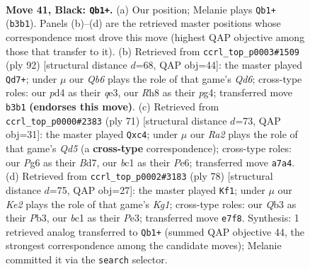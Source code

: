 \documentclass[11pt]{article}
\begin{document}
\clearpage

\begin{figure}[p]\centering
\begin{subfigure}{0.46\textwidth}\centering
\resizebox{\linewidth}{!}{%
\newchessgame
\chessboard[
  setfen={7r/r3k3/1pp3p1/4p1p1/Pp1PK3/1q2P3/R5Q1/2B5 b - - 3 41},
  showmover=false,
  pgfstyle=straightmove, color=movearrow, markmove={b3-b1}
]}
\caption{}
\end{subfigure}\hfill
\begin{subfigure}{0.46\textwidth}\centering
\resizebox{\linewidth}{!}{%
\newchessgame
\chessboard[
  setfen={8/p4k2/1p1Q3p/1PP1rp2/1P4pP/3Pq3/7P/5R1K w - - 27 47},
  showmover=false,
  pgfstyle=straightmove, color=movearrow, markmove={d6-d7}
]}
\caption{}
\end{subfigure}
\\[4pt]
\begin{subfigure}{0.46\textwidth}\centering
\resizebox{\linewidth}{!}{%
\newchessgame
\chessboard[
  setfen={r4k2/1p1b4/4p2p/1P1p4/2Bq1P1Q/6Pp/5N1K/5R2 b - - 0 36},
  showmover=false,
  pgfstyle=straightmove, color=movearrow, markmove={d4-c4}
]}
\caption{}
\end{subfigure}\hfill
\begin{subfigure}{0.46\textwidth}\centering
\resizebox{\linewidth}{!}{%
\newchessgame
\chessboard[
  setfen={2r5/5p1k/6p1/Q2p2P1/P1p3qP/1P2P3/5P2/2R3K1 w - - 1 40},
  showmover=false,
  pgfstyle=straightmove, color=movearrow, markmove={g1-f1}
]}
\caption{}
\end{subfigure}
\caption{\textbf{Move 41, Black: \texttt{Qb1+}.} (a) Our position; Melanie plays \texttt{Qb1+} (\texttt{b3b1}). Panels (b)--(d) are the retrieved master positions whose correspondence most drove this move (highest QAP objective among those that transfer to it). (b) Retrieved from \texttt{ccrl\_top\_p0003\#1509} (ply 92) [structural distance $d$=68, QAP obj=44]: the master played \texttt{Qd7+}; under $\mu$ our \emph{Qb6} plays the role of that game's \emph{Qd6}; cross-type roles: our \emph{p}d4 as their \emph{q}e3, our \emph{R}h8 as their \emph{p}g4; transferred move \texttt{b3b1} \textbf{(endorses this move)}. (c) Retrieved from \texttt{ccrl\_top\_p0000\#2383} (ply 71) [structural distance $d$=73, QAP obj=31]: the master played \texttt{Qxc4}; under $\mu$ our \emph{Ra2} plays the role of that game's \emph{Qd5} (a \textbf{cross-type} correspondence); cross-type roles: our \emph{P}g6 as their \emph{B}d7, our \emph{b}c1 as their \emph{P}e6; transferred move \texttt{a7a4}. (d) Retrieved from \texttt{ccrl\_top\_p0002\#3183} (ply 78) [structural distance $d$=75, QAP obj=27]: the master played \texttt{Kf1}; under $\mu$ our \emph{Ke2} plays the role of that game's \emph{Kg1}; cross-type roles: our \emph{Q}b3 as their \emph{P}b3, our \emph{b}c1 as their \emph{P}e3; transferred move \texttt{e7f8}. Synthesis: 1 retrieved analog transferred to \texttt{Qb1+} (summed QAP objective 44, the strongest correspondence among the candidate moves); Melanie committed it via the \texttt{search} selector.}
\label{fig:thought-m81}
\end{figure}
\end{document}
